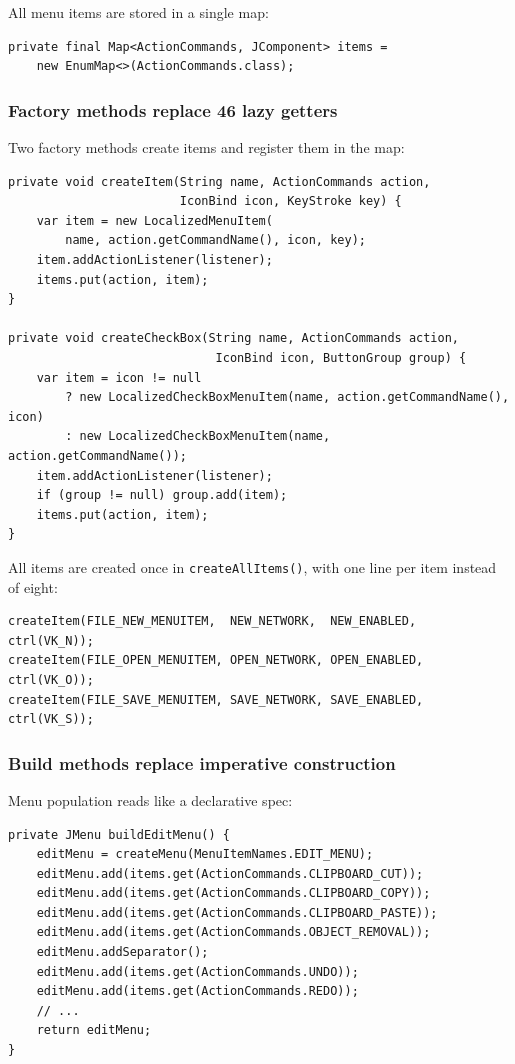 \documentclass[12pt,a4paper]{article}
\newcommand{\meth}[1]{\texttt{#1}}
\begin{document}
All menu items are stored in a single map:
\begin{lstlisting}[caption={Central item storage}]
private final Map<ActionCommands, JComponent> items =
    new EnumMap<>(ActionCommands.class);
\end{lstlisting}

\subsubsection{Factory methods replace 46 lazy getters}

Two factory methods create items and register them in the map:
\begin{lstlisting}[caption={Factory methods (replacing 46 lazy getters)}]
private void createItem(String name, ActionCommands action,
                        IconBind icon, KeyStroke key) {
    var item = new LocalizedMenuItem(
        name, action.getCommandName(), icon, key);
    item.addActionListener(listener);
    items.put(action, item);
}

private void createCheckBox(String name, ActionCommands action,
                             IconBind icon, ButtonGroup group) {
    var item = icon != null
        ? new LocalizedCheckBoxMenuItem(name, action.getCommandName(), icon)
        : new LocalizedCheckBoxMenuItem(name, action.getCommandName());
    item.addActionListener(listener);
    if (group != null) group.add(item);
    items.put(action, item);
}
\end{lstlisting}

All items are created once in \meth{createAllItems()}, with one line
per item instead of eight:
\begin{lstlisting}[caption={Declarative item creation (excerpt)}]
createItem(FILE_NEW_MENUITEM,  NEW_NETWORK,  NEW_ENABLED,  ctrl(VK_N));
createItem(FILE_OPEN_MENUITEM, OPEN_NETWORK, OPEN_ENABLED, ctrl(VK_O));
createItem(FILE_SAVE_MENUITEM, SAVE_NETWORK, SAVE_ENABLED, ctrl(VK_S));
\end{lstlisting}

\subsubsection{Build methods replace imperative construction}

Menu population reads like a declarative spec:
\begin{lstlisting}[caption={Menu builder (example: Edit menu)}]
private JMenu buildEditMenu() {
    editMenu = createMenu(MenuItemNames.EDIT_MENU);
    editMenu.add(items.get(ActionCommands.CLIPBOARD_CUT));
    editMenu.add(items.get(ActionCommands.CLIPBOARD_COPY));
    editMenu.add(items.get(ActionCommands.CLIPBOARD_PASTE));
    editMenu.add(items.get(ActionCommands.OBJECT_REMOVAL));
    editMenu.addSeparator();
    editMenu.add(items.get(ActionCommands.UNDO));
    editMenu.add(items.get(ActionCommands.REDO));
    // ...
    return editMenu;
}
\end{lstlisting}
\end{document}
